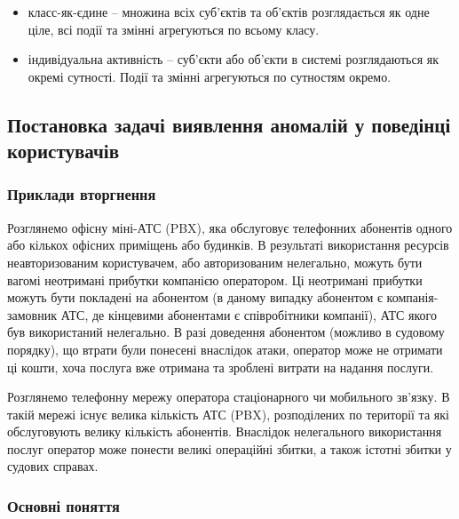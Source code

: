 \begin{itemize}
  \item класс-як-єдине -- множина всіх суб'єктів та об'єктів
        розглядається як одне ціле, всі події та змінні
        агрегуються по всьому класу.
  \item індивідуальна активність -- суб'єкти або об'єкти в 
        системі розглядаються як окремі сутності. Події та змінні агрегуються по сутностям окремо.
\end{itemize}



\subsection{Постановка задачі виявлення аномалій у поведінці користувачів}

\subsubsection{Приклади вторгнення}

  Розглянемо офісну міні-АТС (PBX), яка обслуговує телефонних абонентів одного або кількох офісних приміщень або будинків. В результаті використання ресурсів неавторизованим користувачем, або авторизованим нелегально, можуть бути вагомі неотримані прибутки компанією оператором. Ці неотримані прибутки можуть бути покладені на абонентом (в даному випадку абонентом є компанія-замовник АТС, де кінцевими абонентами є співробітники компанії), АТС якого був використаний нелегально. В разі доведення абонентом (можливо в судовому порядку), що втрати були понесені внаслідок атаки, оператор може не отримати ці кошти, хоча послуга вже отримана та зроблені витрати на надання послуги.

  Розглянемо телефонну мережу оператора стаціонарного чи мобильного зв'язку. В такій мережі існує велика кількість АТС (PBX), розподілених по території та які обслуговують велику кількість абонентів. Внаслідок нелегального використання послуг оператор може понести великі операційні збитки, а також істотні збитки у судових справах.

\subsubsection{Основні поняття}

